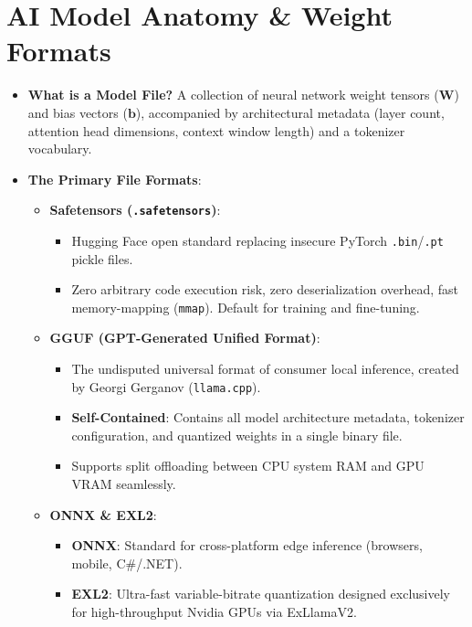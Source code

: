 \documentclass[11pt,a4paper]{article}
\begin{document}
\section{AI Model Anatomy \& Weight Formats}
\begin{itemize}
    \item \textbf{What is a Model File?} A collection of neural network weight tensors ($\mathbf{W}$) and bias vectors ($\mathbf{b}$), accompanied by architectural metadata (layer count, attention head dimensions, context window length) and a tokenizer vocabulary.
    \item \textbf{The Primary File Formats}:
    \begin{itemize}
        \item \textbf{Safetensors (\texttt{.safetensors})}:
        \begin{itemize}
            \item Hugging Face open standard replacing insecure PyTorch \texttt{.bin}/\texttt{.pt} pickle files.
            \item Zero arbitrary code execution risk, zero deserialization overhead, fast memory-mapping (\texttt{mmap}). Default for training and fine-tuning.
        \end{itemize}
        \item \textbf{GGUF (GPT-Generated Unified Format)}:
        \begin{itemize}
            \item The undisputed universal format of consumer local inference, created by Georgi Gerganov (\texttt{llama.cpp}).
            \item \textbf{Self-Contained}: Contains all model architecture metadata, tokenizer configuration, and quantized weights in a single binary file.
            \item Supports split offloading between CPU system RAM and GPU VRAM seamlessly.
        \end{itemize}
        \item \textbf{ONNX \& EXL2}:
        \begin{itemize}
            \item \textbf{ONNX}: Standard for cross-platform edge inference (browsers, mobile, C\#/.NET).
            \item \textbf{EXL2}: Ultra-fast variable-bitrate quantization designed exclusively for high-throughput Nvidia GPUs via ExLlamaV2.
        \end{itemize}
    \end{itemize}
\end{itemize}
\end{document}
